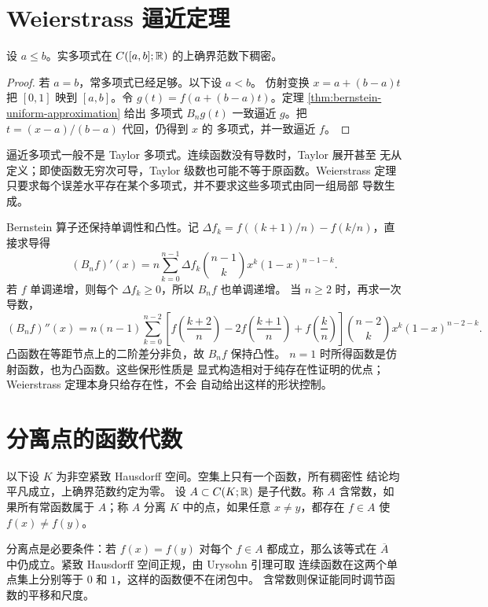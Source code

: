\section{Weierstrass 逼近定理}

\begin{theorem}[Weierstrass]
\label{thm:weierstrass-polynomial-approximation}
设 $a\le b$。实多项式在 $C([a,b];\mathbb{R})$ 的上确界范数下稠密。
\end{theorem}

\begin{proof}
若 $a=b$，常多项式已经足够。以下设 $a<b$。
仿射变换 $x=a+(b-a)t$ 把 $[0,1]$ 映到 $[a,b]$。令
$g(t)=f(a+(b-a)t)$。定理 \ref{thm:bernstein-uniform-approximation} 给出
多项式 $B_ng(t)$ 一致逼近 $g$。把 $t=(x-a)/(b-a)$ 代回，仍得到 $x$ 的
多项式，并一致逼近 $f$。
\end{proof}

逼近多项式一般不是 Taylor 多项式。连续函数没有导数时，Taylor 展开甚至
无从定义；即使函数无穷次可导，Taylor 级数也可能不等于原函数。Weierstrass
定理只要求每个误差水平存在某个多项式，并不要求这些多项式由同一组局部
导数生成。

Bernstein 算子还保持单调性和凸性。记
$\Delta f_k=f((k+1)/n)-f(k/n)$，直接求导得
\[
 (B_nf)'(x)
 =n\sum_{k=0}^{n-1}\Delta f_k
 \binom{n-1}{k}x^k(1-x)^{n-1-k}.
\]
若 $f$ 单调递增，则每个 $\Delta f_k\ge0$，所以 $B_nf$ 也单调递增。
当 $n\ge2$ 时，再求一次导数，
\[
 (B_nf)''(x)
 =n(n-1)\sum_{k=0}^{n-2}
 \left[f\!\left(\frac{k+2}{n}\right)
 -2f\!\left(\frac{k+1}{n}\right)
 +f\!\left(\frac{k}{n}\right)\right]
 \binom{n-2}{k}x^k(1-x)^{n-2-k}.
\]
凸函数在等距节点上的二阶差分非负，故 $B_nf$ 保持凸性。
$n=1$ 时所得函数是仿射函数，也为凸函数。这些保形性质是
显式构造相对于纯存在性证明的优点；Weierstrass 定理本身只给存在性，不会
自动给出这样的形状控制。

\section{分离点的函数代数}

以下设 $K$ 为非空紧致 Hausdorff 空间。空集上只有一个函数，所有稠密性
结论均平凡成立，上确界范数约定为零。
设 $A\subset C(K;\mathbb{R})$ 是子代数。称 $A$
含常数，如果所有常函数属于 $A$；称 $A$ 分离 $K$ 中的点，如果任意
$x\ne y$，都存在 $f\in A$ 使 $f(x)\ne f(y)$。

分离点是必要条件：若 $f(x)=f(y)$ 对每个 $f\in A$ 都成立，那么该等式在
$\overline A$ 中仍成立。紧致 Hausdorff 空间正规，由 Urysohn 引理可取
连续函数在这两个单点集上分别等于 $0$ 和 $1$，这样的函数便不在闭包中。
含常数则保证能同时调节函数的平移和尺度。

